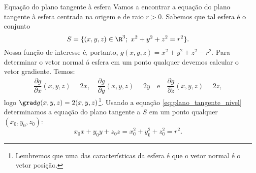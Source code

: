 \begin{example}{Equação do plano tangente à esfera}{}
    Vamos a encontrar a equação do plano tangente à esfera centrada na origem e de raio $r>0$. Sabemos que tal esfera é o conjunto
    $$S=\{(x,y,z)\in\R^3;~x^2+y^2+z^2=r^2\}.$$
Nossa função de interesse é, portanto, $g(x,y,z)=x^2+y^2+z^2-r^2$. Para determinar o vetor normal á esfera em um ponto qualquer devemos calcular o vetor gradiente. Temos:
\begin{align*}
    \dfrac{\partial g}{\partial x}(x,y,z)=2x,\quad
    \dfrac{\partial g}{\partial y}(x,y,z)=2y \quad \mbox{e} \quad
    \dfrac{\partial g}{\partial z}(x,y,z)=2z,
\end{align*}
logo $\grad g(x,y,z)=2(x,y,z)$\footnote{Lembremos que uma das características da esfera é que o vetor normal é o vetor posição.}. 
Usando a equação \eqref{eq:plano_tangente_nivel} determinamos a equação do plano tangente a $S$ em um ponto qualquer $(x_0,y_0,z_0)$: 
$$x_0 x+y_0 y + z_0 z =x_0^2+y_0^2+z_0^2=r^2.$$

\begin{center}
\begin{comment}\begin{tikzpicture}[tdplot_main_coords,scale=2]
\draw[red!140,very thick] plot[domain=0:sqrt(3)/2,smooth,variable=\t] ({-\t},{-0.5},{sqrt(3/4-\t^2)});
		\pgfmathsetmacro{\tini}{0.5*pi}
		\pgfmathsetmacro{\tfin}{1.85*pi}
		\pgfmathsetmacro{\tend}{2.5*pi}
		\draw[-latex] (0,0,0) -- (2.5,0,0) node [below left] {$x$};
		\draw[dashed] (0,0,0) -- (-1.25,0,0);
		\draw[-latex] (0,0,0) -- (0,2,0) node [right] {$y$};
		\draw[dashed] (0,0,0) -- (0,-1.25,0);
		\foreach \altura in {0.0125,0.025,...,1.0}{
			\pgfmathparse{sqrt(1-\altura^2)}
			\pgfmathsetmacro{\radio}{\pgfmathresult}
			\draw[blue!50,opacity=0.5] plot[domain=\tini:\tfin,smooth,variable=\t] ({\radio*cos(\t r)},{\radio*sin(\t r)},{\altura}); 
		}


\end{comment}
\end{center}
\end{example}

